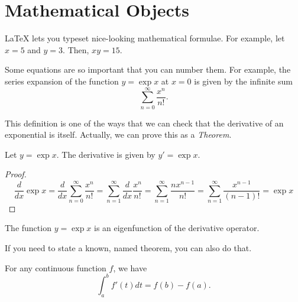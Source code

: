 \documentclass{thesis}
\begin{document}
\section{Mathematical Objects}

LaTeX lets you typeset nice-looking mathematical formulae. For example, let $x = 5$ and $y = 3$. Then, $xy = 15$.

Some equations are so important that you can number them. For example, the series expansion of the function $y = \exp{x}$ at $x=0$ is given by the infinite sum
\begin{equation}
    \sum_{n=0}^{\infty} \frac{x^n}{n!}.
\end{equation}

This definition is one of the ways that we can check that the derivative of an exponential is itself. Actually, we can prove this as a \textit{Theorem}.

\begin{theorem}
    Let $y = \exp{x}$. The derivative is given by $y' = \exp{x}$.
\end{theorem}

\begin{proof}
\[
\frac{d}{dx} \exp{x} = \frac{d}{dx} \sum_{n=0}^{\infty} \frac{x^n}{n!} = \sum_{n=1}^{\infty} \frac{d}{dx} \frac{x^n}{n!} = \sum_{n=1}^{\infty}  \frac{n x^{n-1}}{n!} = \sum_{n=1}^{\infty}  \frac{x^{n-1}}{(n-1)!} = \exp{x}
\]
\end{proof}

\begin{corollary}
    The function $y=\exp{x}$ is an eigenfunction of the derivative operator.
\end{corollary}

\noindent If you need to state a known, named theorem, you can also do that.

\begin{theorem}
For any continuous function $f$, we have
    \[
    \int_{a}^{b} f'(t) dt = f(b) - f(a).
    \]
\end{theorem}
\end{document}
